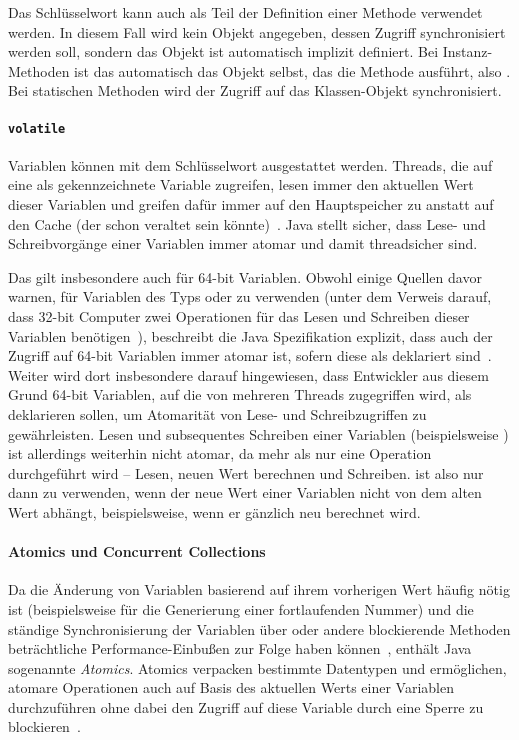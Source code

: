 Das Schlüsselwort  kann auch als Teil der Definition einer Methode verwendet werden. In diesem Fall wird kein Objekt angegeben, dessen Zugriff synchronisiert werden soll, sondern das Objekt ist automatisch implizit definiert. Bei Instanz-Methoden ist das automatisch das Objekt selbst, das die Methode ausführt, also . Bei statischen Methoden wird der Zugriff auf das Klassen-Objekt synchronisiert.

\paragraph{\texttt{volatile}} Variablen können mit dem Schlüsselwort  ausgestattet werden. Threads, die auf eine als  gekennzeichnete Variable zugreifen, lesen immer den aktuellen Wert dieser Variablen und greifen dafür immer auf den Hauptspeicher zu anstatt auf den Cache (der schon veraltet sein könnte)~\cite[S.~30~ff.]{Friesen2015}. Java stellt sicher, dass Lese- und Schreibvorgänge einer  Variablen immer atomar und damit threadsicher sind.

Das gilt insbesondere auch für 64-bit Variablen. Obwohl einige Quellen davor warnen,  für Variablen des Typs  oder  zu verwenden (unter dem Verweis darauf, dass 32-bit Computer zwei Operationen für das Lesen und Schreiben dieser Variablen benötigen~\cite[S.~34]{Friesen2015}), beschreibt die Java Spezifikation explizit, dass auch der Zugriff auf 64-bit Variablen immer atomar ist, sofern diese als  deklariert sind~\cite{Java7Spec17}. Weiter wird dort insbesondere darauf hingewiesen, dass Entwickler aus diesem Grund 64-bit Variablen, auf die von mehreren Threads zugegriffen wird, als  deklarieren sollen, um Atomarität von Lese- und Schreibzugriffen zu gewährleisten. Lesen und subsequentes Schreiben einer  Variablen (beispielsweise ) ist allerdings weiterhin nicht atomar, da mehr als nur eine Operation durchgeführt wird -- Lesen, neuen Wert berechnen und Schreiben.  ist also nur dann zu verwenden, wenn der neue Wert einer Variablen nicht von dem alten Wert abhängt, beispielsweise, wenn er gänzlich neu berechnet wird. 

\paragraph{Atomics und Concurrent Collections} Da die Änderung von Variablen basierend auf ihrem vorherigen Wert häufig nötig ist (beispielsweise für die Generierung einer fortlaufenden Nummer) und die ständige Synchronisierung der Variablen über  oder andere blockierende Methoden beträchtliche Performance-Einbußen zur Folge haben können~\cite[S.~130]{Friesen2015}, enthält Java sogenannte \emph{Atomics}. Atomics verpacken bestimmte Datentypen und ermöglichen, atomare Operationen auch auf Basis des aktuellen Werts einer Variablen durchzuführen ohne dabei den Zugriff auf diese Variable durch eine Sperre zu blockieren~\cite[S.~130]{Friesen2015}. 

